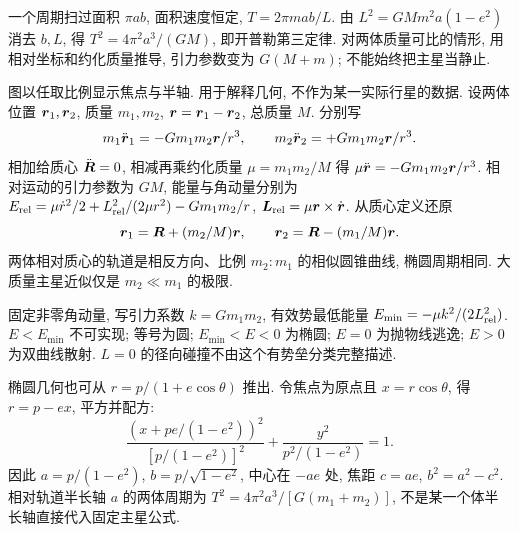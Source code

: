 一个周期扫过面积 $\pi ab$, 面积速度恒定, $T=2\pi mab/L$. 由 $L^2=GMm^2a(1-e^2)$ 消去 $b,L$, 得 $T^2=4\pi^2a^3/(GM)$, 即开普勒第三定律. 对两体质量可比的情形, 用相对坐标和约化质量推导, 引力参数变为 $G(M+m)$; 不能始终把主星当静止.
\begin{center}
\end{center}
图以任取比例显示焦点与半轴. 用于解释几何, 不作为某一实际行星的数据.
设两体位置 $\boldsymbol{r}_1,\boldsymbol{r}_2$, 质量 $m_1,m_2$, $\boldsymbol{r}=\boldsymbol{r}_1-\boldsymbol{r}_2$, 总质量 $M$. 分别写
\begin{equation}
m_1\ddot{\boldsymbol{r}}_1=-Gm_1m_2\boldsymbol{r}/r^3,\qquad
m_2\ddot{\boldsymbol{r}}_2=+Gm_1m_2\boldsymbol{r}/r^3.
\end{equation}
相加给质心 $\ddot{\boldsymbol{R}}=0$, 相减再乘约化质量 $\mu=m_1m_2/M$ 得 $\mu\ddot{\boldsymbol{r}}=-Gm_1m_2\boldsymbol{r}/r^3$. 相对运动的引力参数为 $GM$, 能量与角动量分别为 $E_{\rm rel}=\mu\dot r^2/2+L_{\rm rel}^2/(2\mu r^2)-Gm_1m_2/r$, $\boldsymbol{L}_{\rm rel}=\mu\boldsymbol{r}\times\dot{\boldsymbol{r}}$. 从质心定义还原
\begin{equation}
\boldsymbol{r}_1=\boldsymbol{R}+(m_2/M)\boldsymbol{r},\qquad
\boldsymbol{r}_2=\boldsymbol{R}-(m_1/M)\boldsymbol{r}.
\end{equation}
两体相对质心的轨道是相反方向、比例 $m_2:m_1$ 的相似圆锥曲线, 椭圆周期相同. 大质量主星近似仅是 $m_2\ll m_1$ 的极限.

固定非零角动量, 写引力系数 $k=Gm_1m_2$, 有效势最低能量 $E_{\min}=-\mu k^2/(2L_{\rm rel}^2)$. $E<E_{\min}$ 不可实现; 等号为圆; $E_{\min}<E<0$ 为椭圆; $E=0$ 为抛物线逃逸; $E>0$ 为双曲线散射. $L=0$ 的径向碰撞不由这个有势垒分类完整描述.

椭圆几何也可从 $r=p/(1+e\cos\theta)$ 推出. 令焦点为原点且 $x=r\cos\theta$, 得 $r=p-ex$, 平方并配方:
\begin{equation}
\frac{(x+pe/(1-e^2))^2}{[p/(1-e^2)]^2}
+\frac{y^2}{p^2/(1-e^2)}=1.
\end{equation}
因此 $a=p/(1-e^2)$, $b=p/\sqrt{1-e^2}$, 中心在 $-ae$ 处, 焦距 $c=ae$, $b^2=a^2-c^2$. 相对轨道半长轴 $a$ 的两体周期为 $T^2=4\pi^2a^3/[G(m_1+m_2)]$, 不是某一个体半长轴直接代入固定主星公式.

